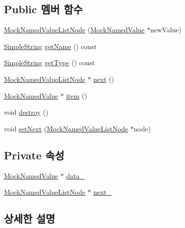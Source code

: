 \subsection*{Public 멤버 함수}
\begin{DoxyCompactItemize}
\item 
\hyperlink{class_mock_named_value_list_node_a4622317a1b52266be2c86efd6683f546}{Mock\+Named\+Value\+List\+Node} (\hyperlink{class_mock_named_value}{Mock\+Named\+Value} $\ast$new\+Value)
\item 
\hyperlink{class_simple_string}{Simple\+String} \hyperlink{class_mock_named_value_list_node_ab9fb89f09ab681191e4eaa9221b42491}{get\+Name} () const 
\item 
\hyperlink{class_simple_string}{Simple\+String} \hyperlink{class_mock_named_value_list_node_a149f9255153928a6fff62d1ff94d9dcf}{get\+Type} () const 
\item 
\hyperlink{class_mock_named_value_list_node}{Mock\+Named\+Value\+List\+Node} $\ast$ \hyperlink{class_mock_named_value_list_node_adaf0ca3232d35f7efae1bade86b8027e}{next} ()
\item 
\hyperlink{class_mock_named_value}{Mock\+Named\+Value} $\ast$ \hyperlink{class_mock_named_value_list_node_a8c58d84cd5019852d8a742312c700594}{item} ()
\item 
void \hyperlink{class_mock_named_value_list_node_a3a80b6032f86a56bec74609034b3246f}{destroy} ()
\item 
void \hyperlink{class_mock_named_value_list_node_aaf65c8dad0363e65312a8b1d06e0911b}{set\+Next} (\hyperlink{class_mock_named_value_list_node}{Mock\+Named\+Value\+List\+Node} $\ast$node)
\end{DoxyCompactItemize}
\subsection*{Private 속성}
\begin{DoxyCompactItemize}
\item 
\hyperlink{class_mock_named_value}{Mock\+Named\+Value} $\ast$ \hyperlink{class_mock_named_value_list_node_ab749429ebd2ea1be2ba34f32ea8d4406}{data\+\_\+}
\item 
\hyperlink{class_mock_named_value_list_node}{Mock\+Named\+Value\+List\+Node} $\ast$ \hyperlink{class_mock_named_value_list_node_a0cb6abfe488f90be4d539bc57f3a4708}{next\+\_\+}
\end{DoxyCompactItemize}


\subsection{상세한 설명}


